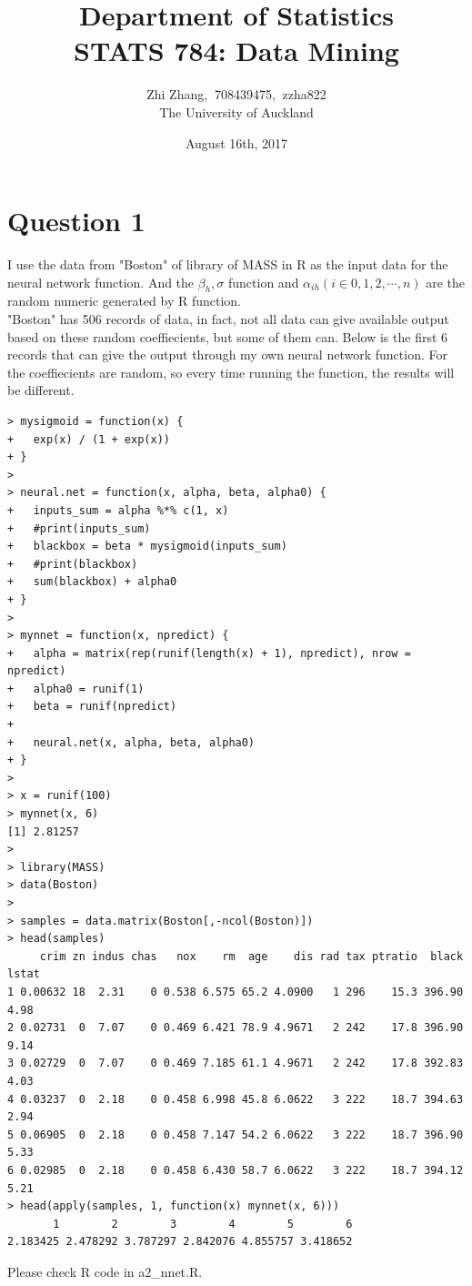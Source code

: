 \documentclass{article}%
\begin{document}
\title{Department of  Statistics \\ STATS 784: Data Mining}
\author{Zhi Zhang, $\ $708439475, $\ $zzha822
\\The University of Auckland}
\date{August 16th, 2017}
\maketitle


\section{Question 1}
I use the data from "Boston" of library of MASS in R as the input data for the neural network function. And the $\beta_{h}, \sigma$ function and $\alpha_{ih} (i \in {0, 1, 2, \cdots, n})$ are the random numeric generated by R function.\\
\indent "Boston" has 506 records of data, in fact, not all data can give available output based on these random coeffiecients, but some of them can. Below is the first 6 records that can give the output through my own neural network function. For the coeffiecients are random, so every time running the function, the results will be different.
\begin{verbatim}
> mysigmoid = function(x) {
+   exp(x) / (1 + exp(x))
+ }
>
> neural.net = function(x, alpha, beta, alpha0) {
+   inputs_sum = alpha %*% c(1, x)
+   #print(inputs_sum)
+   blackbox = beta * mysigmoid(inputs_sum)
+   #print(blackbox)
+   sum(blackbox) + alpha0
+ }
>
> mynnet = function(x, npredict) {
+   alpha = matrix(rep(runif(length(x) + 1), npredict), nrow = npredict)
+   alpha0 = runif(1)
+   beta = runif(npredict)
+
+   neural.net(x, alpha, beta, alpha0)
+ }
>
> x = runif(100)
> mynnet(x, 6)
[1] 2.81257
>
> library(MASS)
> data(Boston)
>
> samples = data.matrix(Boston[,-ncol(Boston)])
> head(samples)
     crim zn indus chas   nox    rm  age    dis rad tax ptratio  black lstat
1 0.00632 18  2.31    0 0.538 6.575 65.2 4.0900   1 296    15.3 396.90  4.98
2 0.02731  0  7.07    0 0.469 6.421 78.9 4.9671   2 242    17.8 396.90  9.14
3 0.02729  0  7.07    0 0.469 7.185 61.1 4.9671   2 242    17.8 392.83  4.03
4 0.03237  0  2.18    0 0.458 6.998 45.8 6.0622   3 222    18.7 394.63  2.94
5 0.06905  0  2.18    0 0.458 7.147 54.2 6.0622   3 222    18.7 396.90  5.33
6 0.02985  0  2.18    0 0.458 6.430 58.7 6.0622   3 222    18.7 394.12  5.21
> head(apply(samples, 1, function(x) mynnet(x, 6)))
       1        2        3        4        5        6
2.183425 2.478292 3.787297 2.842076 4.855757 3.418652
\end{verbatim}
Please check R code in a2\_nnet.R.
\end{document}
